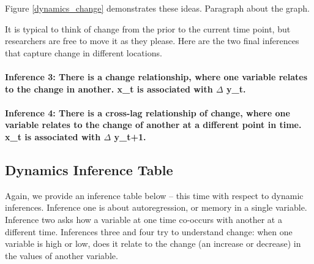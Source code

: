\documentclass[english,,man]{apa6}
\let\oldparagraph\paragraph
\renewcommand{\paragraph}[1]{\oldparagraph{#1}\mbox{}}
\theoremstyle{definition}
\theoremstyle{definition}
\theoremstyle{definition}
\theoremstyle{remark}
\begin{document}
Figure \ref{dynamics_change} demonstrates these ideas. Paragraph about
the graph.

It is typical to think of change from the prior to the current time
point, but researchers are free to move it as they please. Here are the
two final inferences that capture change in different locations.

\hypertarget{inference-3-there-is-a-change-relationship-where-one-variable-relates-to-the-change-in-another.-x_t-is-associated-with-delta-y_t.}{%
\paragraph{\texorpdfstring{Inference 3: There is a change relationship,
where one variable relates to the change in another. x\_t is associated
with \(\Delta\)
y\_t.}{Inference 3: There is a change relationship, where one variable relates to the change in another. x\_t is associated with \textbackslash{}Delta y\_t.}}\label{inference-3-there-is-a-change-relationship-where-one-variable-relates-to-the-change-in-another.-x_t-is-associated-with-delta-y_t.}}

\hypertarget{inference-4-there-is-a-cross-lag-relationship-of-change-where-one-variable-relates-to-the-change-of-another-at-a-different-point-in-time.-x_t-is-associated-with-delta-y_t1.}{%
\paragraph{\texorpdfstring{Inference 4: There is a cross-lag
relationship of change, where one variable relates to the change of
another at a different point in time. x\_t is associated with \(\Delta\)
y\_t+1.}{Inference 4: There is a cross-lag relationship of change, where one variable relates to the change of another at a different point in time. x\_t is associated with \textbackslash{}Delta y\_t+1.}}\label{inference-4-there-is-a-cross-lag-relationship-of-change-where-one-variable-relates-to-the-change-of-another-at-a-different-point-in-time.-x_t-is-associated-with-delta-y_t1.}}

\hypertarget{dynamics-inference-table}{%
\subsection{Dynamics Inference Table}\label{dynamics-inference-table}}

Again, we provide an inference table below -- this time with respect to
dynamic inferences. Inference one is about autoregression, or memory in
a single variable. Inference two asks how a variable at one time
co-occurs with another at a different time. Inferences three and four
try to understand change: when one variable is high or low, does it
relate to the change (an increase or decrease) in the values of another
variable.
\end{document}
